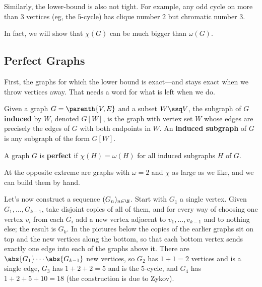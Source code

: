 Similarly, the lower-bound is also not tight. For example, any odd cycle on more than $3$ vertices (eg, the $5$-cycle) has clique number $2$ but chromatic number $3$.

\begin{figure}[H]
    \centering
\end{figure}

In fact, we will show that $\chi(G)$ can be much bigger than $\omega(G)$.

\subsection{Perfect Graphs}

First, the graphs for which the lower bound is exact---and stays exact when we throw vertices away. That needs a word for what is left when we do.

\begin{boxdefinition}
    Given a graph $G = \parenth{V, E}$ and a subset $W \ssq V$, the subgraph of $G$ \textbf{induced} by $W$, denoted $G[W]$, is the graph with vertex set $W$ whose edges are precisely the edges of $G$ with both endpoints in $W$. An \textbf{induced subgraph} of $G$ is any subgraph of the form $G[W]$.
\end{boxdefinition}

\begin{boxdefinition}
    A graph $G$ is \textbf{perfect} if $\chi(H) = \omega(H)$ for all induced subgraphs $H$ of $G$.
\end{boxdefinition}

At the opposite extreme are graphs with $\omega = 2$ and $\chi$ as large as we like, and we can build them by hand.

Let's now construct a sequence $(G_n)_{n \in \N}$. Start with $G_1$ a single vertex. Given $G_1, \ldots, G_{k-1}$, take disjoint copies of all of them, and for every way of choosing one vertex $v_i$ from each $G_i$ add a new vertex adjacent to $v_1, \ldots, v_{k-1}$ and to nothing else; the result is $G_k$. In the pictures below the copies of the earlier graphs sit on top and the new vertices along the bottom, so that each bottom vertex sends exactly one edge into each of the graphs above it. There are $\abs{G_1} \cdots \abs{G_{k-1}}$ new vertices, so $G_2$ has $1 + 1 = 2$ vertices and is a single edge, $G_3$ has $1 + 2 + 2 = 5$ and is the $5$-cycle, and $G_4$ has $1 + 2 + 5 + 10 = 18$ (the construction is due to Zykov).

